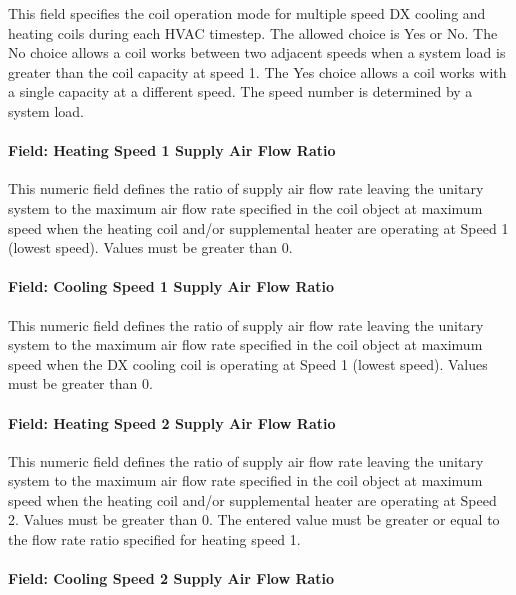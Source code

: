 This field specifies the coil operation mode for multiple speed DX cooling and heating coils during each HVAC timestep. The allowed choice is Yes or No. The No choice allows a coil works between two adjacent speeds when a system load is greater than the coil capacity at speed 1. The Yes choice allows a coil works with a single capacity at a different speed. The speed number is determined by a system load.

\paragraph{Field: Heating Speed 1 Supply Air Flow Ratio}\label{field-heating-speed-1-supply-air-flow-ratio}

This numeric field defines the ratio of supply air flow rate leaving the unitary system to the maximum air flow rate specified in the coil object at maximum speed when the heating coil and/or supplemental heater are operating at Speed 1 (lowest speed). Values must be greater than 0.

\paragraph{Field: Cooling Speed 1 Supply Air Flow Ratio}\label{field-cooling-speed-1-supply-air-flow-ratio}

This numeric field defines the ratio of supply air flow rate leaving the unitary system to the maximum air flow rate specified in the coil object at maximum speed when the DX cooling coil is operating at Speed 1 (lowest speed). Values must be greater than 0.

\paragraph{Field: Heating Speed 2 Supply Air Flow Ratio}\label{field-heating-speed-2-supply-air-flow-ratio}

This numeric field defines the ratio of supply air flow rate leaving the unitary system to the maximum air flow rate specified in the coil object at maximum speed when the heating coil and/or supplemental heater are operating at Speed 2. Values must be greater than 0. The entered value must be greater or equal to the flow rate ratio specified for heating speed 1.

\paragraph{Field: Cooling Speed 2 Supply Air Flow Ratio}\label{field-cooling-speed-2-supply-air-flow-ratio}

